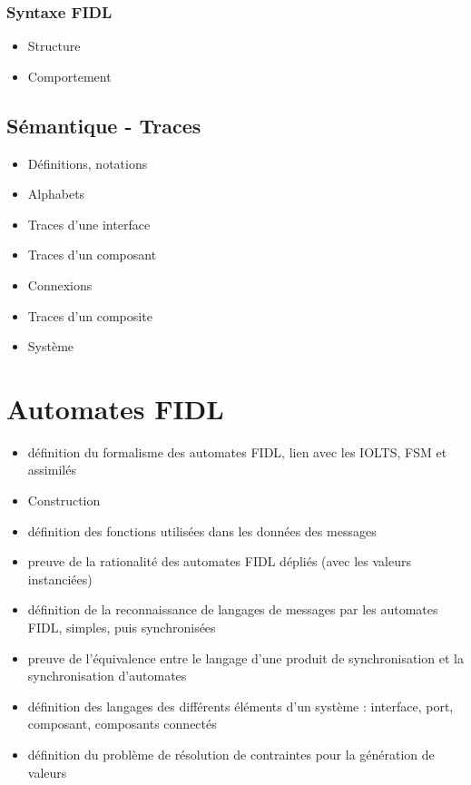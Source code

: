 \documentclass[french,a4paper,leqno,twoside]{book}
\begin{document}
\subsection{Syntaxe FIDL}
\begin{itemize}
  \item Structure 
  \item Comportement
\end{itemize}

\section{S\'emantique - Traces} 
 
\begin{itemize}
  \item D\'efinitions, notations
  \item Alphabets
  \item Traces d'une interface
  \item Traces d'un composant
  \item Connexions
  \item Traces d'un composite
  \item Syst\`eme
\end{itemize}

\chapter{Automates FIDL}

\begin{itemize}
  \item d\'efinition du formalisme des automates FIDL, lien avec les
    IOLTS, FSM et assimil\'es
  \item Construction
  \item d\'efinition des fonctions utilis\'ees dans les donn\'ees
    des messages
  \item preuve de la rationalit\'e des automates FIDL d\'epli\'es
    (avec les valeurs instanci\'ees)
  \item d\'efinition de la reconnaissance de langages de messages par
    les automates FIDL, simples, puis synchronis\'ees
  \item preuve de l'\'equivalence entre le langage d'une produit de
    synchronisation et la synchronisation d'automates
  \item d\'efinition des langages des diff\'erents \'el\'ements
    d'un syst\`eme : interface, port, composant, composants
    connect\'es
  \item d\'efinition du probl\`eme de r\'esolution de contraintes
    pour la g\'en\'eration de valeurs
\end{itemize}
\end{document}
